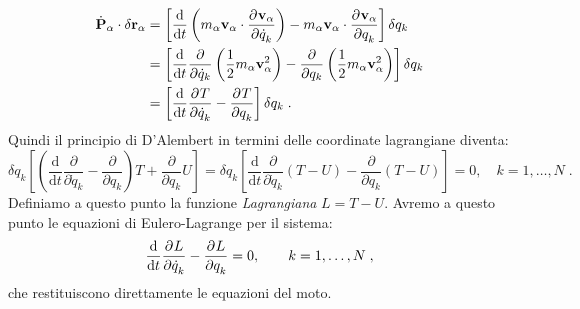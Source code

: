 \begin{align}
\dot{\mathbf{P}}_{\alpha}\cdot\delta\mathbf{r}_{\alpha}&=\left[\frac{\mathrm{d}}{\mathrm{d}t}\left(m_{\alpha}\mathbf{v}_{\alpha} 
\cdot \frac{\partial^{}\mathbf{v}_{\alpha}}{\partial \dot{q}_k^{}}\right)-m_{\alpha}\mathbf{v}_{\alpha}\cdot \frac{\partial^{}\mathbf{v}_{\alpha}}{\partial q_k^{}}\right]\delta q_k \notag \\
&= \left[\frac{\mathrm{d}}{\mathrm{d}t}\frac{\partial}{\partial\dot{q}_k}\left(\frac{1}{2}m_{\alpha}\mathbf{v}_{\alpha}^2\right)-\frac{\partial}{\partial q_k}\left(\frac{1}{2} m_{\alpha}\mathbf{v}_{\alpha}^2\right)\right]\delta q_k \notag \\
&= \left[\frac{\mathrm{d}}{\mathrm{d}t}\frac{\partial^{}T}{\partial \dot{q}_k^{}}-\frac{\partial^{}T}{\partial q_k^{}}\right]\delta q_k\;.
\end{align}
Quindi il principio di D'Alembert in termini delle coordinate lagrangiane diventa:
\begin{equation}
\delta q_k \left[\left(\frac{\mathrm{d}}{\mathrm{d}t}\frac{\partial}{\partial \dot{q}_k}- \frac{\partial}{\partial q_k}\right)T+\frac{\partial}{\partial q_k}U\right]=\delta q_k\left[\frac{\mathrm{d}}{\mathrm{d}t}\frac{\partial}{\partial \dot{q}_k}(T-U)-\frac{\partial}{\partial q_k}(T-U)\right]=0, \quad k=1,\ldots, N\;.
\end{equation}
Definiamo a questo punto la funzione \textit{Lagrangiana} $L=T-U$. Avremo a questo punto le equazioni di Eulero-Lagrange per il sistema:
\begin{equation}
\frac{\mathrm{d}}{\mathrm{d}{t}}\frac{\partial^{}L}{\partial \dot{q}_k^{}}-\frac{\partial^{}L}{\partial q_k^{}}=0,\qquad k=1,\ldots, N\;,
\end{equation}
che restituiscono direttamente le equazioni del moto.

